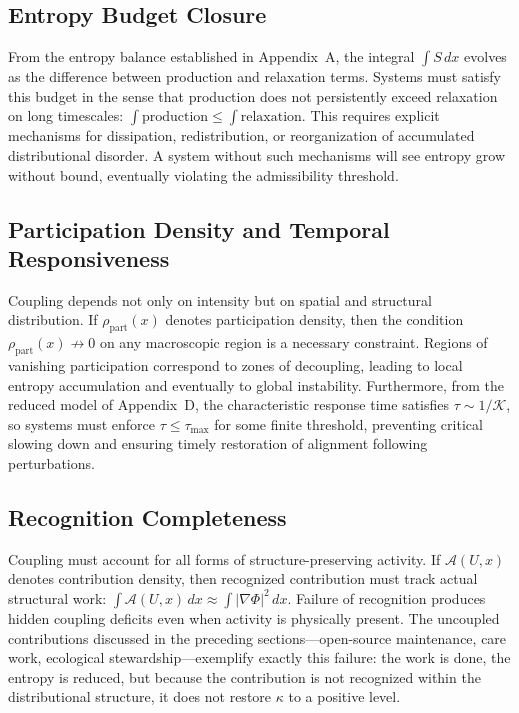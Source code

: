 \documentclass[11pt, a4paper]{article}
\theoremstyle{plain}
\theoremstyle{definition}
\newcommand{\Phifield}{\Phi}
\newcommand{\Sfield}{S}
\newcommand{\coupling}{\kappa}
\begin{document}
\subsection*{Entropy Budget Closure}

From the entropy balance established in Appendix~A, the integral $\int \Sfield\, dx$ evolves as the difference between production and relaxation terms. Systems must satisfy this budget in the sense that production does not persistently exceed relaxation on long timescales: $\int \text{production} \leq \int \text{relaxation}$. This requires explicit mechanisms for dissipation, redistribution, or reorganization of accumulated distributional disorder. A system without such mechanisms will see entropy grow without bound, eventually violating the admissibility threshold.

\subsection*{Participation Density and Temporal Responsiveness}

Coupling depends not only on intensity but on spatial and structural distribution. If $\rho_{\mathrm{part}}(x)$ denotes participation density, then the condition $\rho_{\mathrm{part}}(x) \not\to 0$ on any macroscopic region is a necessary constraint. Regions of vanishing participation correspond to zones of decoupling, leading to local entropy accumulation and eventually to global instability. Furthermore, from the reduced model of Appendix~D, the characteristic response time satisfies $\tau \sim 1/\mathcal{K}$, so systems must enforce $\tau \leq \tau_{\max}$ for some finite threshold, preventing critical slowing down and ensuring timely restoration of alignment following perturbations.

\subsection*{Recognition Completeness}

Coupling must account for all forms of structure-preserving activity. If $\mathcal{A}(U,x)$ denotes contribution density, then recognized contribution must track actual structural work: $\int \mathcal{A}(U,x)\, dx \approx \int |\nabla \Phifield|^2\, dx$. Failure of recognition produces hidden coupling deficits even when activity is physically present. The uncoupled contributions discussed in the preceding sections---open-source maintenance, care work, ecological stewardship---exemplify exactly this failure: the work is done, the entropy is reduced, but because the contribution is not recognized within the distributional structure, it does not restore $\coupling$ to a positive level.
\end{document}
